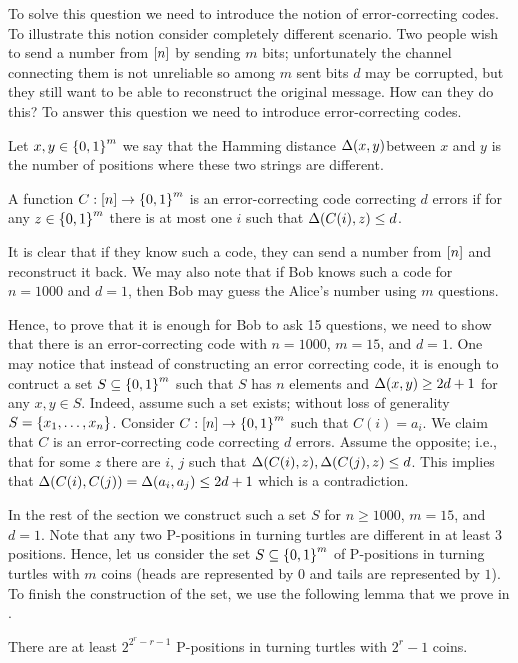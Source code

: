 To solve this question we need to introduce the notion of error-correcting
codes. To illustrate this notion consider completely different scenario.
Two people wish to send a number from ${[{n}]}$ by sending $m$ bits;
unfortunately the channel connecting them is not unreliable so among $m$ sent
bits $d$ may be corrupted, but they still want to be able to reconstruct the
original message. How can they do this? To answer this question we need to
introduce error-correcting codes.
\begin{definition}
  Let $x, y \in \set{0, 1}^m$ we say that the Hamming distance 
  $\Delta({x}, {y})$between $x$ and
  $y$ is the number of positions where these two strings are different.

  A function $C : \range{n} \to \set{0, 1}^m$ is an error-correcting code
  correcting $d$ errors if for any $z \in \set{0, 1}^m$ there is at most one 
  $i$ such that $\Delta({C(i)}, {z}) \le d$.
\end{definition}
It is clear that if they know such a code, they can send a number from
${[{n}]}$ and reconstruct it back. We may also note that if Bob knows such a
code for $n = 1000$ and $d = 1$, then Bob may guess the Alice's number using $m$
questions.


Hence, to prove that it is enough for Bob to ask 15 questions, we need to show
that there is an error-correcting code with $n = 1000$, $m = 15$, and $d = 1$.
One may notice that instead of constructing an error correcting code, it is
enough to contruct a set $S \subseteq \set{0, 1}^m$ such that $S$ has $n$
elements and $\Delta({x}, {y}) \ge 2d + 1$ for any $x, y \in S$. Indeed, assume
such a set exists; without loss of generality $S = \set{x_1, \dots, x_n}$.
Consider $C : \range{n} \to \set{0, 1}^m$ such that $C(i) = a_i$. We claim that
$C$ is an error-correcting code correcting $d$ errors. Assume the opposite;
i.e., that for some $z$ there are $i$, $j$ such that 
$\Delta({C(i)}, {z}), \Delta({C(j)}, {z}) \le d$. This implies that 
$\Delta({C(i)}, {C(j)}) = \Delta({a_i}, {a_j}) \le 2d + 1$ which is a
contradiction.


In the rest of the section we construct such a set $S$ for $n \ge 1000$, $m =
15$, and $d = 1$. Note that any two P-positions in turning turtles are different
in at least $3$ positions. Hence, let us consider the set 
$S \subseteq \set{0, 1}^m$ of P-positions in turning turtles with $m$ coins
(heads are represented by $0$ and tails are represented by $1$). To finish the
construction of the set, we use the following lemma that we prove in
.
\begin{lemma}
\label{lemma:turning-turtles-number-P}
  There are at least $2^{2^r - r - 1}$ P-positions in turning turtles with 
  $2^r - 1$ coins.
\end{lemma}

